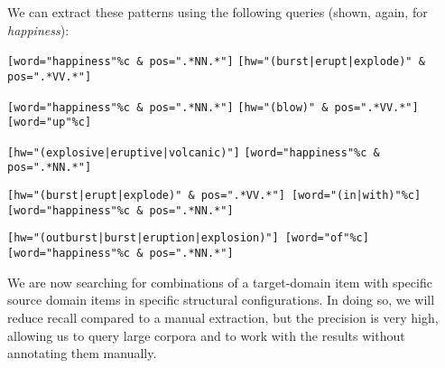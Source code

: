 We can extract  these patterns using the following queries (shown, again, for  \textit{happiness}):

\begin{exe}
\ex
\begin{xlist}
\label{ex:emotionburstingquery}
\ex \begin{minipage}[t]{0.85\textwidth} \raggedright \texttt{[word="happiness"\%c \& pos=".*NN.*"]} \texttt{[hw="(burst|\allowbreak erupt|\allowbreak explode)" \& pos=".*VV.*"]} \end{minipage}
\ex \begin{minipage}[t]{0.85\textwidth} \raggedright \texttt{[word="happiness"\%c \& pos=".*NN.*"]} \texttt{[hw="(blow)" \& pos=".*VV.*"][word="up"\%c]} \end{minipage}
\ex \begin{minipage}[t]{0.85\textwidth} \raggedright \texttt{[hw="(explosive|\allowbreak eruptive|\allowbreak volcanic)"]} \texttt{[word="happiness"\%c \& pos=".*NN.*"]} \end{minipage}
\ex \begin{minipage}[t]{0.85\textwidth} \raggedright \texttt{[hw="(burst|\allowbreak erupt|\allowbreak explode)" \& pos=".*VV.*"] [word="(in|\allowbreak with)"\%c]} \texttt{[word="happiness"\%c \& pos=".*NN.*"]} \end{minipage}
\ex \begin{minipage}[t]{0.85\textwidth} \raggedright \texttt{[hw="(outburst|\allowbreak burst|\allowbreak eruption|\allowbreak explosion)"] [word="of"\%c]} \texttt{[word="happiness"\%c \& pos=".*NN.*"]} \end{minipage}
\end{xlist}
\end{exe}

We are now searching for combinations of a target\hyp{}domain item with specific source domain items in specific structural configurations. In doing so, we will reduce recall  compared to a manual  extraction,  but the precision  is very high, allowing us to query large  corpora and to work with the results without annotating  them manually.

